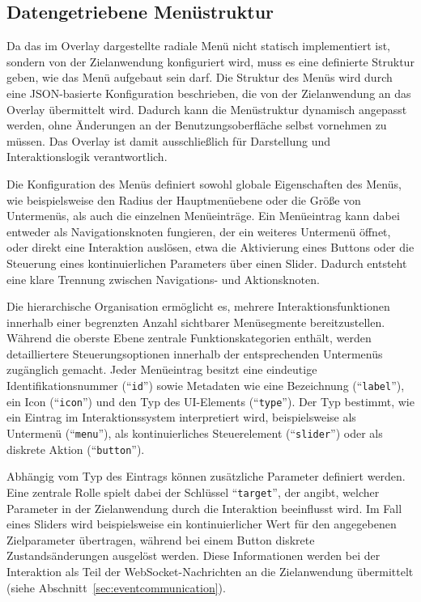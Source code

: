 \subsection{Datengetriebene Menüstruktur}
Da das im Overlay dargestellte radiale Menü nicht statisch implementiert ist, sondern von der Zielanwendung konfiguriert wird, muss es eine definierte Struktur geben, wie das Menü aufgebaut sein darf. Die Struktur des Menüs wird durch eine JSON-basierte Konfiguration beschrieben, die von der Zielanwendung an das Overlay übermittelt wird. Dadurch kann die Menüstruktur dynamisch angepasst werden, ohne Änderungen an der Benutzungsoberfläche selbst vornehmen zu müssen. Das Overlay ist damit ausschließlich für Darstellung und Interaktionslogik verantwortlich.

Die Konfiguration des Menüs definiert sowohl globale Eigenschaften des Menüs, wie beispielsweise den Radius der Hauptmenüebene oder die Größe von Untermenüs, als auch die einzelnen Menüeinträge.
Ein Menüeintrag kann dabei entweder als Navigationsknoten fungieren, der ein weiteres Untermenü öffnet, oder direkt eine Interaktion auslösen, etwa die Aktivierung eines Buttons oder die Steuerung eines kontinuierlichen Parameters über einen Slider. Dadurch entsteht eine klare Trennung zwischen Navigations- und Aktionsknoten.

Die hierarchische Organisation ermöglicht es, mehrere Interaktionsfunktionen innerhalb einer begrenzten Anzahl sichtbarer Menüsegmente bereitzustellen. 
Während die oberste Ebene zentrale Funktionskategorien enthält, werden detailliertere Steuerungsoptionen innerhalb der entsprechenden Untermenüs zugänglich gemacht.
Jeder Menüeintrag besitzt eine eindeutige Identifikationsnummer (``\texttt{id}'') sowie Metadaten wie eine Bezeichnung (``\texttt{label}''), ein Icon (``\texttt{icon}'') und den Typ des UI-Elements (``\texttt{type}''). Der Typ bestimmt, wie ein Eintrag im Interaktionssystem interpretiert wird, beispielsweise als Untermenü (``\texttt{menu}''), als kontinuierliches Steuerelement (``\texttt{slider}'') oder als diskrete Aktion (``\texttt{button}'').

Abhängig vom Typ des Eintrags können zusätzliche Parameter definiert werden. Eine zentrale Rolle spielt dabei der Schlüssel ``\texttt{target}'', der angibt, welcher Parameter in der Zielanwendung durch die Interaktion beeinflusst wird. Im Fall eines Sliders wird beispielsweise ein kontinuierlicher Wert für den angegebenen Zielparameter übertragen, während bei einem Button diskrete Zustandsänderungen ausgelöst werden. Diese Informationen werden bei der Interaktion als Teil der WebSocket-Nachrichten an die Zielanwendung übermittelt (siehe Abschnitt~\ref{sec:eventcommunication}).

